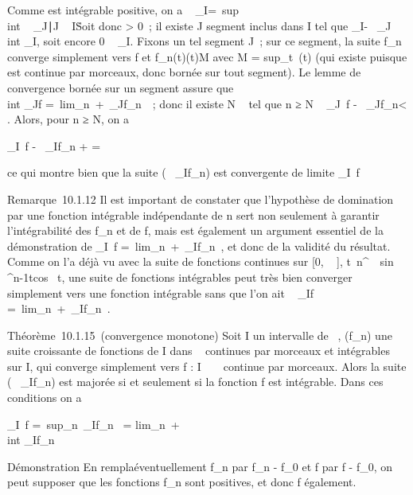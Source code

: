 \documentclass[]{article}
\begin{document}
Comme \phi est intégrable positive, on a \int ~
_I\phi =\
sup\\int ~
_J\phi∣J \subset~ I\. Soit donc
\epsilon > 0~; il existe J segment inclus dans I tel que
\int  _I\phi -\epsilon{}~
\leq\int  _J~\phi \leq\\int
 _I\phi, soit encore 0 \leq\int ~
_I\diagdownJ\phi \leq \epsilon{}. Fixons un tel segment J~;
sur ce segment, la suite f_n converge simplement vers f et
f_n(t)\leq \phi(t)\leq M avec M
= sup_t\inJ~\phi(t) (qui existe puisque \phi
est continue par morceaux, donc bornée sur tout segment). Le lemme de
convergence bornée sur un segment assure que \\int
 _Jf =\
lim_n\rightarrow~+\infty~\int  _Jf_n~~;
donc il existe N \in {}~ tel que n ≥ N \rigtharrow~\left
\int  _J~f
-\int ~
_Jf_n\right  <
\epsilon{}. Alors, pour n ≥ N, on a

\left \int  _I~f
-\int ~
_If_n\right {}\epsilon{} + \epsilon{} = \epsilon

ce qui montre bien que la suite (\int ~
_If_n) est convergente de limite
\int  _I~f

Remarque~10.1.12 Il est important de constater que l'hypothèse de
domination par une fonction intégrable \phi indépendante de n sert non
seulement à garantir l'intégrabilité des f_n et de f, mais est
également un argument essentiel de la démonstration de
\int  _I~f =\
lim_n\rightarrow~+\infty~\int  _If_n~,
et donc de la validité du résultat. Comme on l'a déjà vu avec la suite
de fonctions continues sur [0, \pi~ ],
t\mapsto~n^\alpha~\
sin ^n-1tcos~ t, une suite de
fonctions intégrables peut très bien converger simplement vers une
fonction intégrable sans que l'on ait \int ~
_If =\
lim_n\rightarrow~+\infty~\int  _If_n~.

Théorème~10.1.15~(convergence monotone) Soit I un intervalle de ~,
(f_n) une suite croissante de fonctions de I dans ~ continues
par morceaux et intégrables sur I, qui converge simplement vers f : I \rightarrow~
\mathbb{R}~ continue par morceaux. Alors la suite (\int ~
_If_n) est majorée si et seulement si la fonction f est
intégrable. Dans ces conditions on a

\int  _I~f =\
sup_n\in\mathbb{N}~\int  _If_n~
= lim_n\rightarrow~+\infty~~\\int
 _If_n

Démonstration En rempla\ccant éventuellement
f_n par f_n - f_0 et f par f - f_0,
on peut supposer que les fonctions f_n sont positives, et donc
f également.
\end{document}
